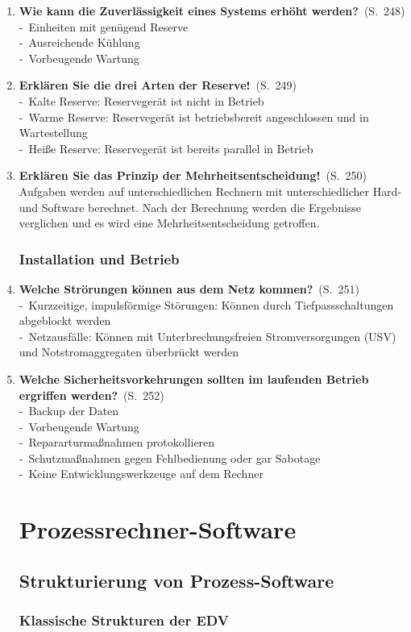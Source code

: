 \documentclass[a4paper,12pt]{article}
\newcommand{\question}[3]{\pagebreak[3]\item {\textbf{#1?}}\ (S.\ #2)#3}
\newcommand{\statement}[3]{\pagebreak[3]\item {\textbf{#1!}}\ (S.\ #2)#3}
\newcommand{\catchword}[1]{\\-\ #1}
\newcommand{\normaltext}[1]{\\#1}
\newcommand{\page}[1]{#1}
\begin{document}
\begin{enumerate}
  \question{Wie kann die Zuverlässigkeit eines Systems erhöht werden}{\page{248}}
  {
    \catchword{Einheiten mit genügend Reserve}
    \catchword{Ausreichende Kühlung}
    \catchword{Vorbeugende Wartung}
  }

  \statement{Erklären Sie die drei Arten der Reserve}{\page{249}}
  {
    \catchword{Kalte Reserve: Reservegerät ist nicht in Betrieb}
    \catchword{Warme Reserve: Reservegerät ist betriebsbereit angeschlossen und
               in Wartestellung}
    \catchword{Heiße Reserve: Reservegerät ist bereits parallel in Betrieb}
  }

  \statement{Erklären Sie das Prinzip der Mehrheitsentscheidung}{\page{250}}
  {
    \normaltext{Aufgaben werden auf unterschiedlichen Rechnern mit unterschiedlicher Hard-
                und Software berechnet. Nach der Berechnung werden die Ergebnisse verglichen
                und es wird eine Mehrheitsentscheidung getroffen.}
  }

  \subsubsection{Installation und Betrieb}

  \question{Welche Strörungen können aus dem Netz kommen}{\page{251}}
  {
    \catchword{Kurzzeitige, impulsförmige Störungen: Können durch Tiefpassschaltungen
               abgeblockt werden}
    \catchword{Netzausfälle: Können mit Unterbrechungsfreien Stromversorgungen (USV) und
               Notstromaggregaten überbrückt werden}
  }

  \question{Welche Sicherheitsvorkehrungen sollten im laufenden Betrieb ergriffen werden}{\page{252}}
  {
    \catchword{Backup der Daten}
    \catchword{Vorbeugende Wartung}
    \catchword{Repararturmaßnahmen protokollieren}
    \catchword{Schutzmaßnahmen gegen Fehlbedienung oder gar Sabotage}
    \catchword{Keine Entwicklungswerkzeuge auf dem Rechner}
  }

  \newpage
  \section{Prozessrechner-Software}

  \subsection{Strukturierung von Prozess-Software}

  \subsubsection{Klassische Strukturen der EDV}


\end{enumerate}
\end{document}

